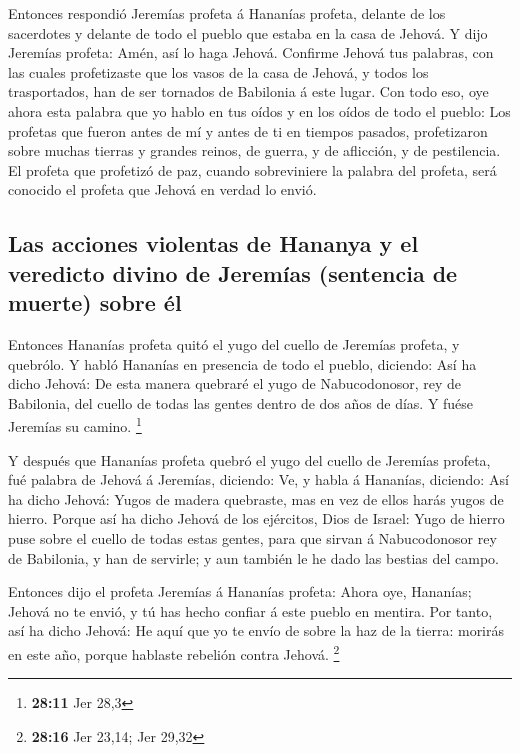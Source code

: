 Entonces respondió Jeremías profeta á Hananías profeta,
delante de los sacerdotes y delante de todo el pueblo que estaba en la
casa de Jehová.  Y dijo Jeremías profeta: Amén, así lo haga
Jehová. Confirme Jehová tus palabras, con las cuales profetizaste que
los vasos de la casa de Jehová, y todos los trasportados, han de ser
tornados de Babilonia á este lugar.  Con todo eso, oye ahora
esta palabra que yo hablo en tus oídos y en los oídos de todo el pueblo:
 Los profetas que fueron antes de mí y antes de ti en
tiempos pasados, profetizaron sobre muchas tierras y grandes reinos, de
guerra, y de aflicción, y de pestilencia.  El profeta que
profetizó de paz, cuando sobreviniere la palabra del profeta, será
conocido el profeta que Jehová en verdad lo envió.

\hypertarget{las-acciones-violentas-de-hananya-y-el-veredicto-divino-de-jeremuxedas-sentencia-de-muerte-sobre-uxe9l}{%
\subsection{Las acciones violentas de Hananya y el veredicto divino de
Jeremías (sentencia de muerte) sobre
él}\label{las-acciones-violentas-de-hananya-y-el-veredicto-divino-de-jeremuxedas-sentencia-de-muerte-sobre-uxe9l}}

 Entonces Hananías profeta quitó el yugo del cuello de
Jeremías profeta, y quebrólo.  Y habló Hananías en
presencia de todo el pueblo, diciendo: Así ha dicho Jehová: De esta
manera quebraré el yugo de Nabucodonosor, rey de Babilonia, del cuello
de todas las gentes dentro de dos años de días. Y fuése Jeremías su
camino. \footnote{\textbf{28:11} Jer 28,3}

 Y después que Hananías profeta quebró el yugo del cuello
de Jeremías profeta, fué palabra de Jehová á Jeremías, diciendo:
 Ve, y habla á Hananías, diciendo: Así ha dicho Jehová:
Yugos de madera quebraste, mas en vez de ellos harás yugos de hierro.
 Porque así ha dicho Jehová de los ejércitos, Dios de
Israel: Yugo de hierro puse sobre el cuello de todas estas gentes, para
que sirvan á Nabucodonosor rey de Babilonia, y han de servirle; y aun
también le he dado las bestias del campo.

 Entonces dijo el profeta Jeremías á Hananías profeta:
Ahora oye, Hananías; Jehová no te envió, y tú has hecho confiar á este
pueblo en mentira.  Por tanto, así ha dicho Jehová: He aquí
que yo te envío de sobre la haz de la tierra: morirás en este año,
porque hablaste rebelión contra Jehová. \footnote{\textbf{28:16} Jer
  23,14; Jer 29,32}

